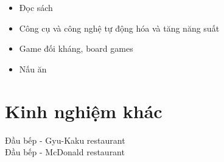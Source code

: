 \documentclass{res}
\newcommand{\inFrench}[1]{}
\newcommand{\inEnglish}[1]{#1}
\begin{document}
\begin{resume}
\inEnglish{
	\vspace{6pt}
	\begin{itemize} \itemsep -2pt
		\item Đọc sách
		\item Công cụ và công nghệ tự động hóa và tăng năng suất
		\item Game đối kháng, board games
		\item Nấu ăn
	\end{itemize}
}
\inFrench{
	\section{Expériences connexes}
}
\inEnglish{
	\section{Kinh nghiệm khác}
}
\vspace{6pt}

%
%
%
%

\inEnglish{
	Đầu bếp - Gyu-Kaku restaurant \\
	Đầu bếp - McDonald restaurant

	\vspace{0.05in}


}
\end{resume}
\end{document}
